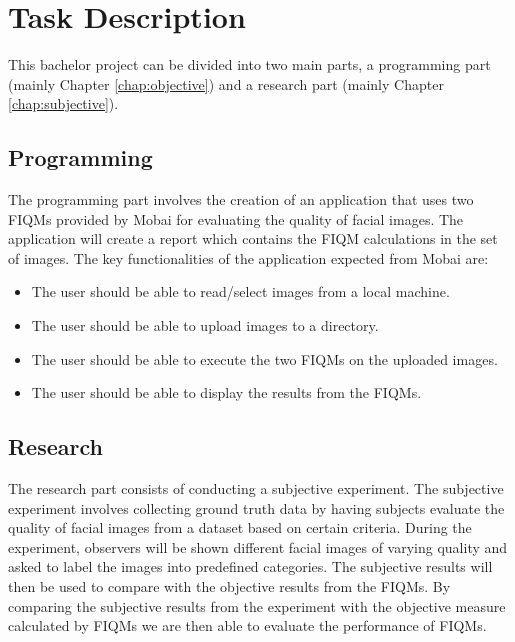 \section{Task Description}
\label{sec:TaskD}
This bachelor project can be divided into two main parts, a programming part (mainly Chapter \ref{chap:objective}) and a research part (mainly Chapter \ref{chap:subjective}).

\subsection*{Programming}
The programming part involves the creation of an application that uses two FIQMs provided by Mobai for evaluating the quality of facial images. The application will create a report which contains the FIQM calculations in the set of images. The key functionalities of the application expected from Mobai are: 
\begin{itemize}
    \item The user should be able to read/select images from a local machine.
    \item The user should be able to upload images to a directory.
    \item The user should be able to execute the two FIQMs on the uploaded images.
    \item The user should be able to display the results from the FIQMs. 
\end{itemize}

\subsection*{Research}
The research part consists of conducting a subjective experiment. The subjective experiment involves collecting ground truth data by having subjects evaluate the quality of facial images from a dataset based on certain criteria. During the experiment, observers will be shown different facial images of varying quality and asked to label the images into predefined categories. The subjective results will then be used to compare with the objective results from the FIQMs. By comparing the subjective results from the experiment with the objective measure calculated by FIQMs we are then able to evaluate the performance of FIQMs. 

